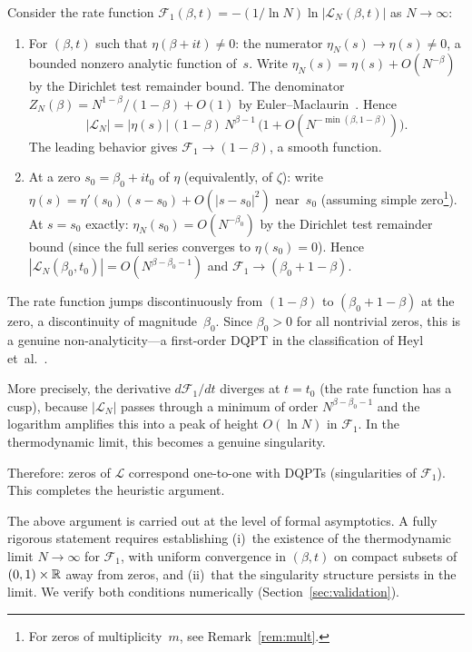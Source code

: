 Consider the rate function $\mathcal{F}_1(\beta,t) = -(1/\ln N)\ln|\mathcal{L}_N(\beta,t)|$
as $N \to \infty$:
\begin{enumerate}
  \item[(i)] For $(\beta,t)$ such that $\eta(\beta+it) \ne 0$:
    the numerator $\eta_N(s) \to \eta(s) \ne 0$, a bounded nonzero analytic function
    of~$s$. Write $\eta_N(s) = \eta(s) + O(N^{-\beta})$ by the Dirichlet test remainder
    bound. The denominator $Z_N(\beta) = N^{1-\beta}/(1-\beta) + O(1)$ by
    Euler--Maclaurin~\cite{titchmarsh1986}. Hence
    \begin{equation}
      |\mathcal{L}_N| = |\eta(s)|\,(1-\beta)\,N^{\beta-1}\,
      \bigl(1 + O(N^{-\min(\beta,1-\beta)})\bigr).
    \end{equation}
    The leading behavior gives $\mathcal{F}_1 \to (1-\beta)$, a smooth function.
  \item[(ii)] At a zero $s_0 = \beta_0 + it_0$ of $\eta$ (equivalently, of $\zeta$):
    write $\eta(s) = \eta'(s_0)(s-s_0) + O(|s-s_0|^2)$ near~$s_0$ (assuming simple
    zero\footnote{For zeros of multiplicity~$m$, see Remark~\ref{rem:mult}.}). At
    $s = s_0$ exactly: $\eta_N(s_0) = O(N^{-\beta_0})$ by the Dirichlet test remainder
    bound (since the full series converges to $\eta(s_0) = 0$). Hence
    $|\mathcal{L}_N(\beta_0,t_0)| = O(N^{\beta-\beta_0-1})$ and
    $\mathcal{F}_1 \to (\beta_0+1-\beta)$.
\end{enumerate}
The rate function jumps discontinuously from $(1-\beta)$ to $(\beta_0+1-\beta)$ at the
zero, a discontinuity of magnitude~$\beta_0$. Since $\beta_0 > 0$ for all nontrivial
zeros, this is a genuine non-analyticity---a first-order DQPT in the classification of
Heyl et~al.~\cite{heyl2013}.

More precisely, the derivative $d\mathcal{F}_1/dt$ diverges at $t = t_0$ (the rate
function has a cusp), because $|\mathcal{L}_N|$ passes through a minimum of order
$N^{\beta-\beta_0-1}$ and the logarithm amplifies this into a peak of height
$O(\ln N)$ in $\mathcal{F}_1$. In the thermodynamic limit, this becomes a genuine
singularity.

Therefore: zeros of $\mathcal{L}$ correspond one-to-one with DQPTs (singularities of
$\mathcal{F}_1$). This completes the heuristic argument.

\begin{remark}[Rigor]\label{rem:rigor}
The above argument is carried out at the level of formal asymptotics. A fully rigorous
statement requires establishing (i)~the existence of the thermodynamic limit
$N \to \infty$ for $\mathcal{F}_1$, with uniform convergence in $(\beta,t)$ on compact
subsets of $(0,1) \times \mathbb{R}$ away from zeros, and (ii)~that the singularity structure
persists in the limit. We verify both conditions numerically (Section~\ref{sec:validation}).
\end{remark}

